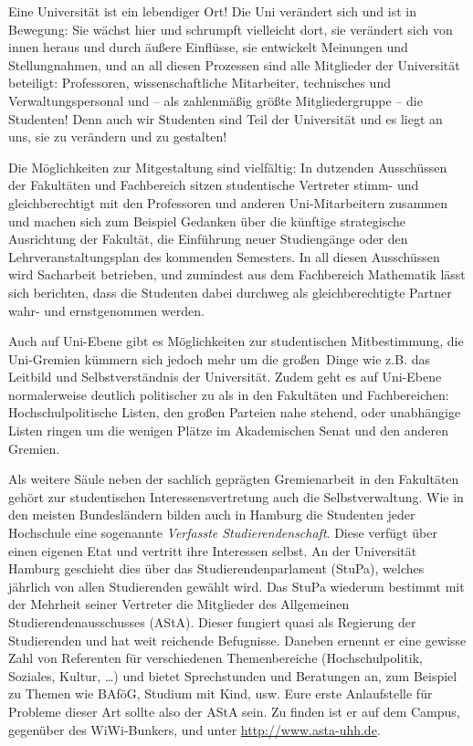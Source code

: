 Eine Universität ist ein lebendiger Ort! Die Uni verändert sich und ist in
Bewegung: Sie wächst hier und schrumpft vielleicht dort, sie verändert sich von
innen heraus und durch äußere Einflüsse, sie entwickelt Meinungen und
Stellungnahmen, und an all diesen Prozessen sind alle Mitglieder der
Universität beteiligt: Professoren, wissenschaftliche Mitarbeiter, technisches
und Verwaltungspersonal und -- als zahlenmäßig größte Mitgliedergruppe -- die
Studenten! Denn auch wir Studenten sind Teil der Universität und es liegt an
uns, sie zu verändern und zu gestalten! 

Die Möglichkeiten zur Mitgestaltung sind vielfältig: In dutzenden Ausschüssen
der Fakultäten und Fachbereich sitzen studentische Vertreter stimm- und
gleichberechtigt mit den Professoren und anderen Uni-Mitarbeitern zusammen und
machen sich zum Beispiel Gedanken über die künftige strategische Ausrichtung
der Fakultät, die Einführung neuer Studiengänge oder den Lehrveranstaltungsplan
des kommenden Semesters. In all diesen Ausschüssen wird Sacharbeit betrieben,
und zumindest aus dem Fachbereich Mathematik lässt sich berichten, dass die
Studenten dabei durchweg als gleichberechtigte Partner wahr- und ernstgenommen
werden. 

Auch auf Uni-Ebene gibt es Möglichkeiten zur studentischen Mitbestimmung, die
Uni-Gremien kümmern sich jedoch mehr um die \glqq großen\grqq\ Dinge wie z.B.
das Leitbild und Selbstverständnis der Universität. Zudem geht es auf Uni-Ebene
normalerweise deutlich politischer zu als in den Fakultäten und Fachbereichen:
Hochschulpolitische Listen, den großen Parteien nahe stehend, oder unabhängige
Listen ringen um die wenigen Plätze im Akademischen Senat und den anderen
Gremien.

Als weitere Säule neben der sachlich geprägten Gremienarbeit in den Fakultäten
gehört zur studentischen Interessensvertretung auch die Selbstverwaltung. Wie
in den meisten Bundesländern bilden auch in Hamburg die Studenten jeder
Hochschule eine sogenannte \emph{Verfasste Studierendenschaft}. Diese verfügt
über einen eigenen Etat und vertritt ihre Interessen selbst. An der Universität
Hamburg geschieht dies über das Studierendenparlament (StuPa), welches jährlich
von allen Studierenden gewählt wird. Das StuPa wiederum bestimmt mit der
Mehrheit seiner Vertreter die Mitglieder des Allgemeinen
Studierendenausschusses (AStA). Dieser fungiert quasi als Regierung der
Studierenden und hat weit reichende Befugnisse. Daneben ernennt er eine gewisse
Zahl von Referenten für verschiedenen Themenbereiche (Hochschulpolitik,
Soziales, Kultur, \ldots) und bietet Sprechstunden und Beratungen an, zum
Beispiel zu Themen wie BAföG, Studium mit Kind, usw. Eure erste Anlaufstelle
für Probleme dieser Art sollte also der AStA sein. Zu finden ist er auf dem
Campus, gegenüber des WiWi-Bunkers, und unter \url{http://www.asta-uhh.de}.

